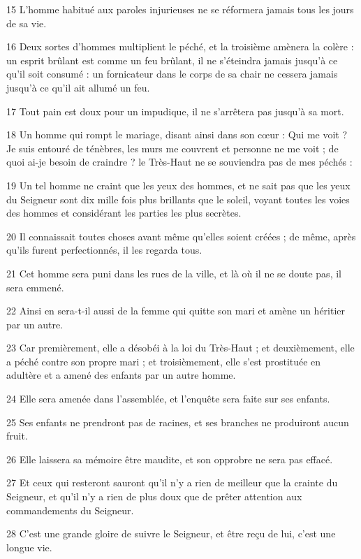 \par 15 L'homme habitué aux paroles injurieuses ne se réformera jamais tous les jours de sa vie.
\par 16 Deux sortes d'hommes multiplient le péché, et la troisième amènera la colère : un esprit brûlant est comme un feu brûlant, il ne s'éteindra jamais jusqu'à ce qu'il soit consumé : un fornicateur dans le corps de sa chair ne cessera jamais jusqu'à ce qu'il ait allumé un feu.
\par 17 Tout pain est doux pour un impudique, il ne s'arrêtera pas jusqu'à sa mort.
\par 18 Un homme qui rompt le mariage, disant ainsi dans son cœur : Qui me voit ? Je suis entouré de ténèbres, les murs me couvrent et personne ne me voit ; de quoi ai-je besoin de craindre ? le Très-Haut ne se souviendra pas de mes péchés :
\par 19 Un tel homme ne craint que les yeux des hommes, et ne sait pas que les yeux du Seigneur sont dix mille fois plus brillants que le soleil, voyant toutes les voies des hommes et considérant les parties les plus secrètes.
\par 20 Il connaissait toutes choses avant même qu'elles soient créées ; de même, après qu'ils furent perfectionnés, il les regarda tous.
\par 21 Cet homme sera puni dans les rues de la ville, et là où il ne se doute pas, il sera emmené.
\par 22 Ainsi en sera-t-il aussi de la femme qui quitte son mari et amène un héritier par un autre.
\par 23 Car premièrement, elle a désobéi à la loi du Très-Haut ; et deuxièmement, elle a péché contre son propre mari ; et troisièmement, elle s'est prostituée en adultère et a amené des enfants par un autre homme.
\par 24 Elle sera amenée dans l'assemblée, et l'enquête sera faite sur ses enfants.
\par 25 Ses enfants ne prendront pas de racines, et ses branches ne produiront aucun fruit.
\par 26 Elle laissera sa mémoire être maudite, et son opprobre ne sera pas effacé.
\par 27 Et ceux qui resteront sauront qu'il n'y a rien de meilleur que la crainte du Seigneur, et qu'il n'y a rien de plus doux que de prêter attention aux commandements du Seigneur.
\par 28 C'est une grande gloire de suivre le Seigneur, et être reçu de lui, c'est une longue vie.

